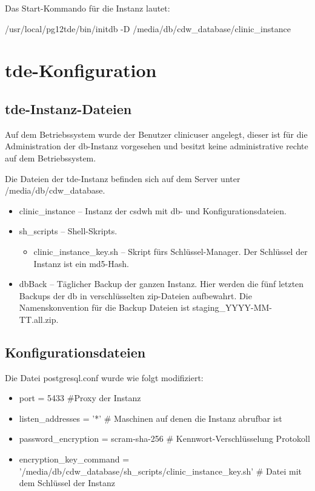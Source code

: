     Das Start-Kommando für die Instanz lautet: 
    
    /usr/local/pg12tde/bin/initdb -D /media/db/cdw\_database/clinic\_instance
    

	\section{\acs{tde}-Konfiguration} 
	
    \subsection{\acs{tde}-Instanz-Dateien}
    Auf dem Betriebssystem wurde der Benutzer \textsf{clinicuser} angelegt, dieser ist für die Administration der \ac{db}-Instanz vorgesehen und besitzt keine administrative rechte auf dem Betriebssystem.
    
    Die Dateien der \ac{tde}-Instanz befinden sich auf dem Server unter \textsf{/media/db/cdw\_database}.
    \begin{itemize}
    	\item \textsf{clinic\_instance} -- Instanz der \ac{csdwh} mit \ac{db}- und Konfigurationsdateien.
    	\item \textsf{sh\_scripts} -- Shell-Skripts.
    	\begin{itemize}
           \item \textsf{clinic\_instance\_key.sh} -- Skript fürs Schlüssel-Manager. Der Schlüssel der Instanz ist ein \ac{md5}-Hash.
    	\end{itemize}
    	\item \textsf{dbBack} -- Täglicher Backup der ganzen Instanz. Hier werden die fünf letzten Backups der \ac{db} in verschlüsselten \ac{zip}-Dateien aufbewahrt. Die Namenskonvention für die Backup Dateien ist \textsf{staging\_YYYY-MM-TT.all.zip}.
    \end{itemize}

    \subsection{Konfigurationsdateien}
    Die Datei \textsf{postgresql.conf} wurde wie folgt modifiziert:
    \begin{itemize}
    	\item \textsf{port = 5433} \#Proxy der Instanz
    	\item \textsf{listen\_addresses = '*'} \# Maschinen auf denen die Instanz abrufbar ist
    	\item \textsf{password\_encryption = scram-sha-256} \# Kennwort-Verschlüsselung Protokoll
    	\item \textsf{encryption\_key\_command = '/media/db/cdw\_database/sh\_scripts/clinic\_instance\_key.sh'} \# Datei mit dem Schlüssel der Instanz
    \end{itemize}

